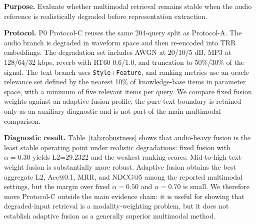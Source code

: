 \textbf{Purpose.} Evaluate whether multimodal retrieval remains stable when the audio reference is realistically degraded before representation extraction.

\textbf{Protocol.} P0 Protocol-C reuses the same 204-query split as Protocol-A. The audio branch is degraded in waveform space and then re-encoded into TRR embeddings. The degradation set includes AWGN at 20/10/5 dB, MP3 at 128/64/32 kbps, reverb with RT60 0.6/1.0, and truncation to 50\%/30\% of the signal. The text branch uses \texttt{Style}+\texttt{Feature}, and ranking metrics use an oracle relevance set defined by the nearest 10\% of knowledge-base items in parameter space, with a minimum of five relevant items per query. We compare fixed fusion weights against an adaptive fusion profile; the pure-text boundary is retained only as an auxiliary diagnostic and is not part of the main multimodal comparison.

\begin{table}[t]
\centering
\caption{P0 Protocol-C: real-degradation fusion robustness on the shared 204-query split. Lower is better for L2; higher is better for all other metrics.}
\label{tab:robustness}
\small
\setlength{\tabcolsep}{3pt}
\end{table}

\textbf{Diagnostic result.} Table~\ref{tab:robustness} shows that audio-heavy fusion is the least stable operating point under realistic degradations: fixed fusion with $\alpha=0.30$ yields L2=29.2322 and the weakest ranking scores. Mid-to-high text-weight fusion is substantially more robust. Adaptive fusion obtains the best aggregate L2, Acc@0.1, MRR, and NDCG@5 among the reported multimodal settings, but the margin over fixed $\alpha=0.50$ and $\alpha=0.70$ is small. We therefore move Protocol-C outside the main evidence chain: it is useful for showing that degraded-input retrieval is a modality-weighting problem, but it does not establish adaptive fusion as a generally superior multimodal method.

